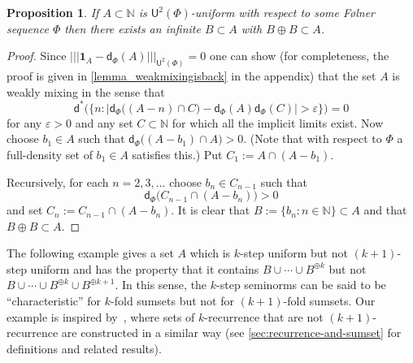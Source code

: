 \documentclass[10pt,dvipsnames]{article}
\newtheorem{proposition}[theorem]{Proposition}
\theoremstyle{definition}
\theoremstyle{plain}
\newcommand{\N}{\mathbb{N}}
\newcommand{\dens}{\mathsf{d}}
\newcommand{\ubdens}{\mathsf{d}^*}
\newcommand{\Folner}{F\o{}lner}
\newcommand{\one}{\boldsymbol{1}}
\newcommand{\ghk}{|\!|\!|}
\newcommand{\ghkn}[1]{\ghk {#1} \ghk}
\newcommand{\un}[2]{{\mathsf{U}^{#1}(#2)}}
\begin{document}
\begin{proposition}
\label{prop_U2_implies_no_shift_needed}
    If $A\subset\N$ is $\un{2}{\Phi}$-uniform with respect to some \Folner{} sequence $\Phi$ then there exists an infinite $B\subset A$ with $B\oplus B\subset A$.
\end{proposition}

\begin{proof}
Since $\ghkn{\one_A-\dens_
    \Phi(A)}_\un{2}{\Phi}=0$ one can show (for completeness, the proof is given in \cref{lemma_weakmixingisback} in the appendix) that the set $A$ is weakly mixing in the sense that
\[
\ubdens\Big(\Big\{n:\big|\dens_\Phi\big((A-n)\cap C\big)-\dens_\Phi(A)\dens_\Phi(C)\big|>\varepsilon\Big\}\Big)=0
\]
for any $\varepsilon>0$ and any set $C\subset\N$ for which all the implicit limits exist. 
Now choose $b_1\in A$ such that $\dens_\Phi\big((A-b_1)\cap A\big)>0$.
(Note that with respect to $\Phi$ a full-density set of $b_1\in A$ satisfies this.)
Put $C_1:=A\cap(A-b_1)$.  

Recursively, for each $n=2,3,\dots$ choose $b_n\in C_{n-1}$ such that
\[
\dens_\Phi\big(C_{n-1}\cap(A-b_n)\big)>0
\]
and set  $C_n:=C_{n-1}\cap(A-b_n)$.
It is clear that $B:=\{b_n:n\in\N\}\subset A$ and that $B\oplus B\subset A$.
\end{proof}


The following example gives a set $A$ which is $k$-step uniform but not $(k+1)$-step uniform and has the property that it contains $B\cup \cdots\cup B^{\oplus k}$ but not $B\cup \cdots\cup B^{\oplus k} \cup B^{\oplus k+1}$.
In this sense, the $k$-step seminorms can be said to be ``characteristic'' for $k$-fold sumsets but not for $(k+1)$-fold sumsets.
Our example is inspired by~\cite{FLW-2006},  where sets of $k$-recurrence that are not $(k+1)$-recurrence are constructed in a similar way (see \cref{sec:recurrence-and-sumset} for definitions and related results).
\end{document}
